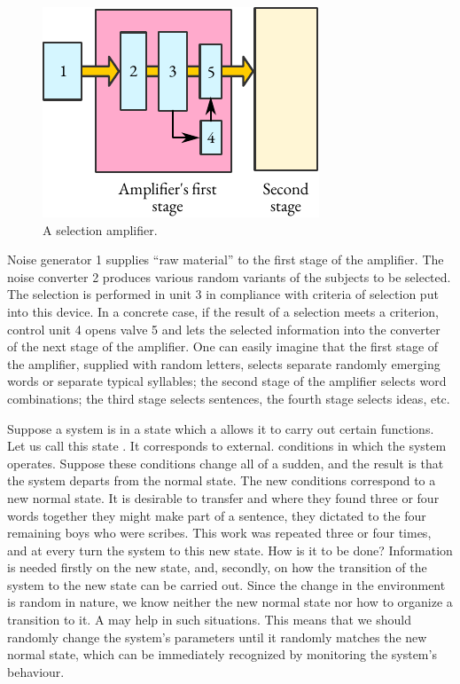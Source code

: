 \begin{figure}
 \centering
 \includegraphics[width=\linewidth]{figures/selection-amp.pdf}
 \caption{A selection amplifier.\label{selection-amp}}
 \end{figure}
Noise generator 1 supplies ``raw material'' to the first stage of the
amplifier. The noise converter 2 produces various random variants of
the subjects to be selected. The selection is performed in unit 3 in
compliance with criteria of selection put into this device. In a concrete
case, if the result of a selection meets a criterion, control unit 4 opens
valve 5 and lets the selected information into the converter of the next
stage of the amplifier. One can easily imagine that the first stage of the
amplifier, supplied with random letters, selects separate randomly
emerging words or separate typical syllables; the second stage of the
amplifier selects word combinations; the third stage selects sentences,
the fourth stage selects ideas, etc.

 Suppose
a system is in a state which a allows it to carry out certain functions. Let
us call this state . It corresponds to external. conditions in which
the system operates. Suppose these conditions change all of a sudden,
and the result is that the system departs from the normal state. The new
conditions correspond to a new normal state. It is desirable to transfer
and where they found three or four words together they might make
part of a sentence, they dictated to the four remaining boys who were
scribes. This work was repeated three or four times, and at every turn
the system to this new state. How is it to be done? Information is
needed firstly on the new state, and, secondly, on how the transition of
the system to the new state can be carried out. Since the change in the
environment is random in nature, we know neither the new normal state
nor how to organize a transition to it. A  may help in
such situations. This means that we should randomly change the
system's parameters until it randomly matches the new normal state,
which can be immediately recognized by monitoring the system's
behaviour.

